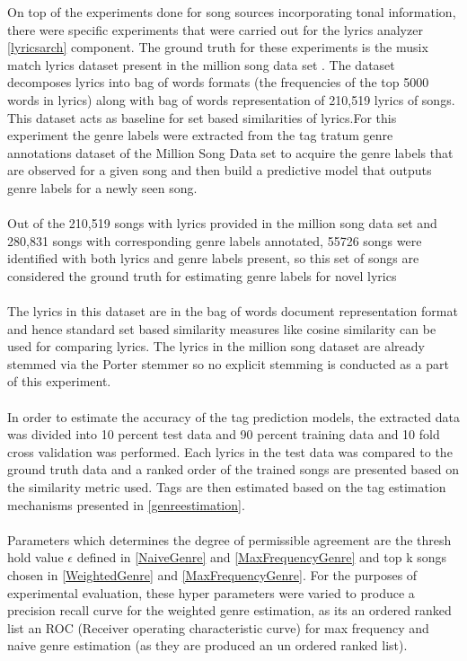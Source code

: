 \noindent On top of the experiments done for song sources incorporating tonal information, there were specific experiments that were carried out for the lyrics analyzer \ref{lyricsarch} component. The ground truth for these experiments is the musix match lyrics dataset present in the million song data set \cite{msd}. The dataset decomposes lyrics into bag of words formats (the frequencies of the top 5000 words in lyrics) along with bag of words representation of 210,519 lyrics of songs. This dataset acts as baseline for set based similarities of lyrics.For this experiment the genre labels were extracted from the tag tratum genre annotations dataset of the Million Song Data set \cite{msd} to acquire the genre labels that are observed for a given song and then build a predictive model that outputs genre labels for a newly seen song. \\\\
Out of the 210,519 songs with lyrics provided in the million song data set and 280,831 songs with corresponding genre labels annotated, 55726 songs were identified with both lyrics and genre labels present, so this set of songs are considered the ground truth for estimating genre labels for novel lyrics \\\\ 
The lyrics in this dataset are in the bag of words document representation format and hence standard set based similarity measures like cosine similarity can be used for comparing lyrics. The lyrics in the million song dataset are already stemmed via the Porter stemmer \cite{msd} so no explicit stemming is conducted as a part of this experiment.\\\\
In order to estimate the accuracy of the tag prediction models, the extracted data was divided into 10 percent test data and 90 percent training data and 10 fold cross validation was performed. Each lyrics in the test data was compared to the ground truth data and a ranked order of the trained songs are presented based on the similarity metric used. Tags are then estimated based on the tag estimation mechanisms presented in \ref{genreestimation}. \\\\
Parameters which determines the degree of permissible agreement are the thresh hold value $\epsilon$ defined in \ref{NaiveGenre} and \ref{MaxFrequencyGenre} and top k songs chosen in \ref{WeightedGenre} and \ref{MaxFrequencyGenre}. For the purposes of experimental evaluation, these hyper parameters were varied to produce a precision recall curve for the weighted genre estimation, as its an ordered ranked list an ROC (Receiver operating characteristic curve) for max frequency and naive genre estimation (as they are produced an un ordered ranked list). 

